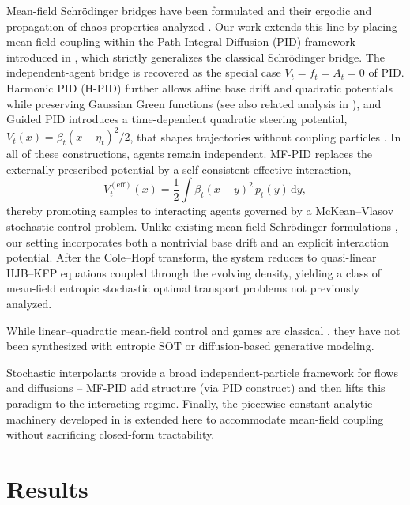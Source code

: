 \documentclass[11pt,onecolumn]{article}
\begin{document}
Mean-field Schr\"odinger bridges have been formulated and their ergodic and propagation-of-chaos properties analyzed \cite{backhoff-veraguas_mean_2019,hernandez_propagation_2024}. Our work extends this line by placing mean-field coupling within the Path-Integral Diffusion (PID) framework introduced in \cite{behjoo_harmonic_2025}, which strictly generalizes the classical Schr\"odinger bridge. The independent-agent bridge is recovered as the special case $V_t=f_t=A_t=0$ of PID. Harmonic PID (H-PID) further allows affine base drift and quadratic potentials while preserving Gaussian Green functions \cite{behjoo_harmonic_2025} (see also related analysis in \cite{teter_weyl_2024}), and Guided PID introduces a time-dependent quadratic steering potential, $V_t(x) = \beta_t(x - \eta_t)^2/2$, that shapes trajectories without coupling particles \cite{chertkov_generative_2025}. In all of these constructions, agents remain independent. MF-PID replaces the externally prescribed potential by a self-consistent effective interaction,
\[
V_t^{(\mathrm{eff})}(x)=\frac{1}{2}\int \beta_t (x-y)^2\,p_t(y)\,\mathrm{d}y,
\]
thereby promoting samples to interacting agents governed by a McKean--Vlasov stochastic control problem. Unlike existing mean-field Schr\"odinger formulations \cite{backhoff-veraguas_mean_2019,hernandez_propagation_2024}, our setting incorporates both a nontrivial base drift and an explicit interaction potential. After the Cole--Hopf transform, the system reduces to quasi-linear HJB--KFP equations coupled through the evolving density, yielding a class of mean-field entropic stochastic optimal transport problems not previously analyzed.

While linear--quadratic mean-field control and games are classical \cite{huang_large-population_2007,bensoussan_mean_2013}, they have not been synthesized with entropic SOT or diffusion-based generative modeling. 

Stochastic interpolants \cite{albergo_building_2023} provide a broad independent-particle framework for flows and diffusions -- MF-PID add structure (via PID construct) and then lifts this paradigm to the interacting regime. Finally, the piecewise-constant analytic machinery developed in \cite{chertkov_adaptive_2025,chertkov_generative_2025} is extended here to accommodate mean-field coupling without sacrificing closed-form tractability.

\section*{Results}
\label{sec:results}
\end{document}
